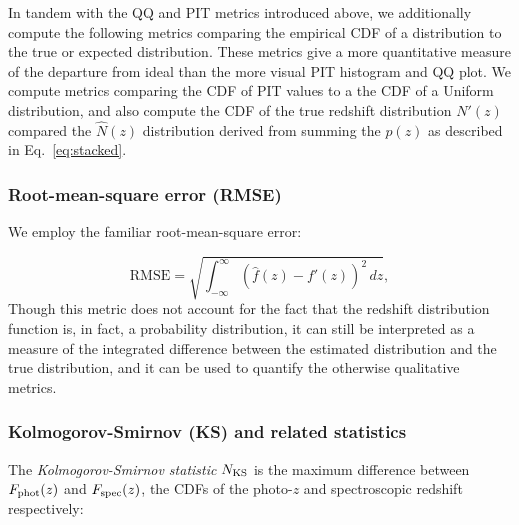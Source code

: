 \documentclass[usenatbib]{mn2e}
\begin{document}
In tandem with the QQ and PIT metrics introduced above, we additionally compute the following metrics comparing the empirical CDF of a distribution to the true or expected distribution.  These metrics give a more quantitative measure of the departure from ideal than the more visual PIT histogram and QQ plot.  We compute metrics comparing the CDF of PIT values to a the CDF of a Uniform distribution, and also compute the CDF of the true redshift distribution $N'(z)$ compared the $\hat{N}(z)$ distribution derived from summing the $p(z)$ as described in Eq.~\ref{eq:stacked}.

\subsubsection{Root-mean-square error (RMSE)}
\label{sec:rmse}

We employ the familiar root-mean-square error:

\begin{equation}
\mathrm{RMSE} = \sqrt{\int_{-\infty}^{\infty}\left(\hat{f}(z)-f'(z)\right)^{2}\,dz},
\end{equation}
Though this metric does not account for the fact that the redshift distribution function is, in fact, a probability distribution, it can still be interpreted as a measure of the integrated difference between the estimated distribution and the true distribution, and it can be used to quantify the otherwise qualitative metrics.


\subsubsection{Kolmogorov-Smirnov (KS) and related statistics}
\label{sec:ks}

The \textit{Kolmogorov-Smirnov statistic} $N_{\rm KS}$ is the maximum difference between $F_{\rm phot}(z)$ and $F_{\rm spec}(z)$, the CDFs of the photo-$z$ and spectroscopic redshift respectively:
\end{document}
